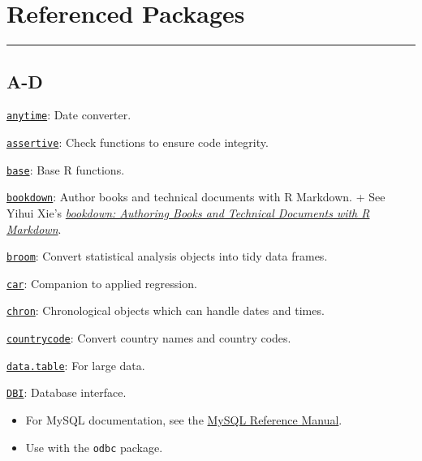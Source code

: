 \documentclass[
]{book}
\begin{document}
\hypertarget{referenced-packages}{%
\chapter{Referenced Packages}\label{referenced-packages}}

\begin{center}\rule{0.5\linewidth}{0.5pt}\end{center}

\hypertarget{a-d}{%
\section{A-D}\label{a-d}}

\href{https://CRAN.R-project.org/package=anytime}{\texttt{anytime}}: Date converter.

\href{https://CRAN.R-project.org/package=assertive}{\texttt{assertive}}: Check functions to ensure code integrity.

\href{https://www.rdocumentation.org/packages/base/versions/3.5.1}{\texttt{base}}: Base R functions.

\href{https://CRAN.R-project.org/package=bookdown}{\texttt{bookdown}}: Author books and technical documents with R Markdown.
+ See Yihui Xie's \href{https://bookdown.org/yihui/bookdown/}{\emph{bookdown: Authoring Books and Technical Documents with R Markdown}}.

\href{https://CRAN.R-project.org/package=broom}{\texttt{broom}}: Convert statistical analysis objects into tidy data frames.

\href{https://CRAN.R-project.org/package=car}{\texttt{car}}: Companion to applied regression.

\href{https://CRAN.R-project.org/package=chron}{\texttt{chron}}: Chronological objects which can handle dates and times.

\href{https://CRAN.R-project.org/package=countrycode}{\texttt{countrycode}}: Convert country names and country codes.

\href{https://CRAN.R-project.org/package=data.table}{\texttt{data.table}}: For large data.

\href{https://CRAN.R-project.org/package=DBI}{\texttt{DBI}}: Database interface.

\begin{itemize}
\item
  For MySQL documentation, see the \href{https://dev.mysql.com/}{MySQL Reference Manual}.
\item
  Use with the \texttt{odbc} package.
\end{itemize}
\end{document}
